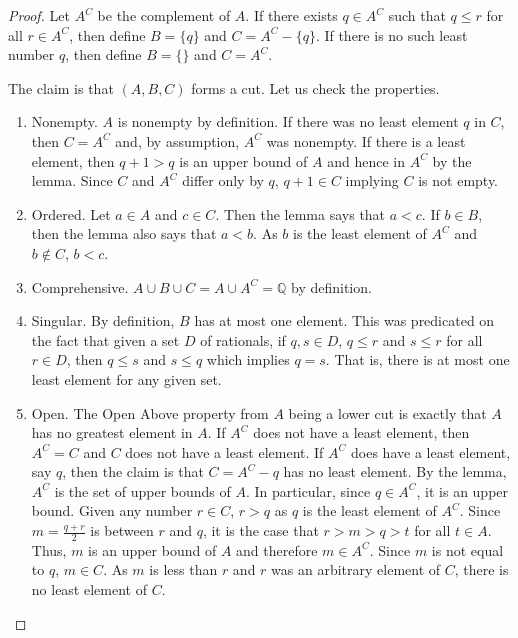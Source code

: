 \documentclass[12pt]{article}
\begin{document}
\begin{proof}
    Let $A^C$ be the complement of $A$. If there exists $q \in A^C$ such that $q \leq r$ for all $r \in A^C$, then define $B = \{q\}$ and $C = A^C - \{q\}$. If there is no such least number $q$, then define $B = \{\}$ and $C = A^C$. 

    The claim is that $(A, B, C)$ forms a cut. Let us check the properties. 

    \begin{enumerate}
        \item Nonempty. $A$ is nonempty by definition. If there was no least element $q$ in $C$, then $C = A^C$ and, by assumption, $A^C$ was nonempty. If there is a least element, then $q+1 > q$ is an upper bound of $A$ and hence in $A^C$ by the lemma. Since $C$ and $A^C$ differ only by $q$, $q+1 \in C$ implying $C$ is not empty. 
        \item Ordered. Let $a \in A$ and $c \in C$. Then the lemma says that $ a< c$. If $b \in B$, then the lemma also says that $a < b$. As $b$ is the least element of $A^C$ and $b \notin C$, $ b < c$. 
        \item Comprehensive. $A \cup B \cup C = A \cup A^C = \mathbb{Q}$ by definition. 
        \item Singular. By definition, $B$ has at most one element. This was predicated on the fact that given a set $D$ of rationals, if $q, s \in D$, $q \leq r$ and $s \leq r$ for all $r \in D$, then $q \leq s$ and $s \leq q$ which implies $q = s$. That is, there is at most one least element for any given set. 
        \item Open. The Open Above property from $A$ being a lower cut is exactly that $A$ has no greatest element in $A$. If $A^C$ does not have a least element, then $A^C = C$ and $C$ does not have a least element. If $A^C$ does have a least element, say $q$, then the claim is that $C= A^C - {q}$ has no least element. By the lemma, $A^C$ is the set of upper bounds of $A$. In particular, since $q \in A^C$, it is an upper bound. Given any number $r \in C$, $r > q$ as $q$ is the least element of $A^C$. Since $m = \frac{q+r}{2}$ is between $r$ and $q$, it is the case that $r > m > q > t$ for all $t \in A$. Thus, $m$ is an upper bound of $A$ and therefore $m \in A^C$. Since $m$ is not equal to $q$, $m \in C$. As $m$ is less than $r$ and $r$ was an arbitrary element of $C$, there is no least element of $C$. 
    \end{enumerate}
\end{proof}
\end{document}
